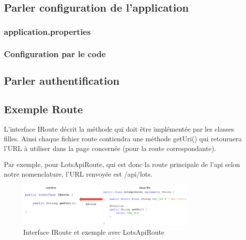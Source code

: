 		\subsection{Parler configuration de l'application}

			\subsubsection{application.properties}


			\subsubsection{Configuration par le code}


		\subsection{Parler authentification}


		\subsection{Exemple Route}

			L'interface IRoute décrit la méthode qui doit être implémentée par les classes filles.\newline
			Ainsi chaque fichier route contiendra une méthode getUri() qui retournera l'URL à utiliser dans la page concernée (pour la route correspondante).

			\noindent
			Par exemple, pour LotsApiRoute, qui est donc la route principale de l'api selon notre nomenclature, l'URL renvoyée est /api/lots.

			\begin{figure}[H]
				\centering\includegraphics[width=0.80\textwidth, keepaspectratio]{res/IRoute.png}
				\caption{Interface IRoute et exemple avec LotsApiRoute}
			\end{figure}



